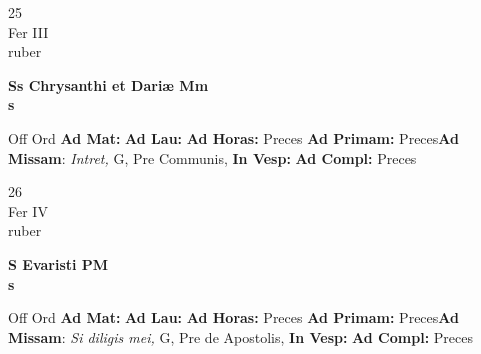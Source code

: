 \documentclass[10pt, openany]{book}
\begin{document}
    \begin{center}
        \begin{minipage}{3.5in}
            \vspace{2em}
            \begin{minipage}{0.5in}
                {\Huge 25} \\
                {\normalsize Fer III} \\
                {\normalsize ruber}
            \end{minipage}
            \begin{minipage}{3.0in}
                \textbf{ \large Ss Chrysanthi et Dariæ Mm \\
                \textnormal{\normalsize s}} \\ 
            \end{minipage}
            \begin{justify}Off Ord
                \textbf{Ad Mat: }
                \textbf{Ad Lau: }
                \textbf{Ad Horas: }Preces
                \textbf{Ad Primam: }Preces\textbf{Ad Missam}: \textit{Intret,} G, Pre Communis,  
                \textbf{In Vesp: }
                \textbf{Ad Compl: }Preces
            \end{justify}
        \end{minipage}
    \end{center}

    \begin{center}
        \begin{minipage}{3.5in}
            \vspace{2em}
            \begin{minipage}{0.5in}
                {\Huge 26} \\
                {\normalsize Fer IV} \\
                {\normalsize ruber}
            \end{minipage}
            \begin{minipage}{3.0in}
                \textbf{ \large S Evaristi PM \\
                \textnormal{\normalsize s}} \\ 
            \end{minipage}
            \begin{justify}Off Ord
                \textbf{Ad Mat: }
                \textbf{Ad Lau: }
                \textbf{Ad Horas: }Preces
                \textbf{Ad Primam: }Preces\textbf{Ad Missam}: \textit{Si diligis mei,} G, Pre de Apostolis,  
                \textbf{In Vesp: }
                \textbf{Ad Compl: }Preces
            \end{justify}
        \end{minipage}
    \end{center}
\end{document}
